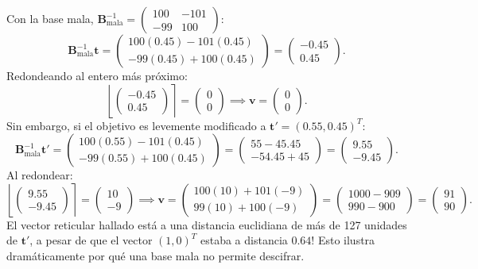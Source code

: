\documentclass[11pt,a4paper,twoside,openright]{book}
\theoremstyle{plain}
\theoremstyle{definition}
\theoremstyle{remark}
\newcommand{\vv}[1]{\mathbf{#1}}
\newcommand{\mm}[1]{\mathbf{#1}}
\newcommand{\round}[1]{\left\lfloor #1 \right\rceil}
\begin{document}
\begin{ejemplopaso}
Con la base mala, $\mm{B}_{\text{mala}}^{-1} = \begin{pmatrix} 100 & -101 \\ -99 & 100 \end{pmatrix}$:
\[
  \mm{B}_{\text{mala}}^{-1} \vv{t} = \begin{pmatrix} 100(0.45) - 101(0.45) \\ -99(0.45) + 100(0.45) \end{pmatrix} = \begin{pmatrix} -0.45 \\ 0.45 \end{pmatrix}.
\]
Redondeando al entero m\'as pr\'oximo:
\[
  \round{\begin{pmatrix} -0.45 \\ 0.45 \end{pmatrix}} = \begin{pmatrix} 0 \\ 0 \end{pmatrix} \implies \vv{v} = \begin{pmatrix} 0 \\ 0 \end{pmatrix}.
\]
Sin embargo, si el objetivo es levemente modificado a $\vv{t}' = (0.55, 0.45)^T$:
\[
  \mm{B}_{\text{mala}}^{-1} \vv{t}' = \begin{pmatrix} 100(0.55) - 101(0.45) \\ -99(0.55) + 100(0.45) \end{pmatrix} = \begin{pmatrix} 55 - 45.45 \\ -54.45 + 45 \end{pmatrix} = \begin{pmatrix} 9.55 \\ -9.45 \end{pmatrix}.
\]
Al redondear:
\[
  \round{\begin{pmatrix} 9.55 \\ -9.45 \end{pmatrix}} = \begin{pmatrix} 10 \\ -9 \end{pmatrix} \implies \vv{v} = \begin{pmatrix} 100(10) + 101(-9) \\ 99(10) + 100(-9) \end{pmatrix} = \begin{pmatrix} 1000 - 909 \\ 990 - 900 \end{pmatrix} = \begin{pmatrix} 91 \\ 90 \end{pmatrix}.
\]
\textexclamdown El vector reticular hallado est\'a a una distancia euclidiana de m\'as de 127 unidades de $\vv{t}'$, a pesar de que el vector $(1, 0)^T$ estaba a distancia $0.64$! Esto ilustra dram\'aticamente por qu\'e una base mala no permite descifrar.
\end{ejemplopaso}
\end{document}
